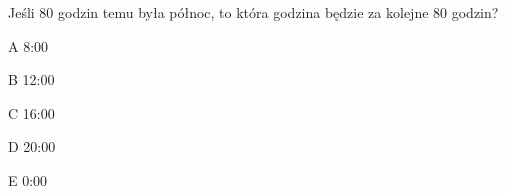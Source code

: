 \begin{tresc}
Jeśli 80 godzin temu była północ, to która godzina będzie za kolejne 80 godzin?
\end{tresc}
\begin{wariant}{A} 8:00 \end{wariant}
\begin{wariant}{B} 12:00 \end{wariant}
\begin{wariant}{C} 16:00 \end{wariant}
\begin{wariant}{D} 20:00 \end{wariant}
\begin{wariant}{E} 0:00 \end{wariant}
